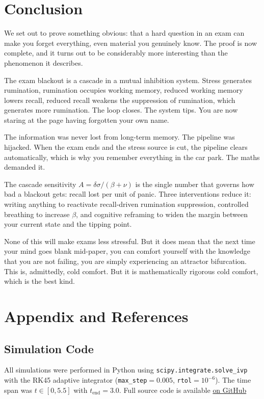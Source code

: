 \documentclass[11pt,a4paper]{article}
\begin{document}
\section{Conclusion}

We set out to prove something obvious: that a hard question in an
exam can make you forget everything, even material you genuinely
know. The proof is now complete, and it turns out to be considerably
more interesting than the phenomenon it describes.

The exam blackout is a cascade in a mutual inhibition system.
Stress generates rumination, rumination occupies working memory,
reduced working memory lowers recall, reduced recall weakens the
suppression of rumination, which generates more rumination. The
loop closes. The system tips. You are now staring at the page
having forgotten your own name.

The information was never lost from long-term memory. The pipeline
was hijacked. When the exam ends and the stress source is cut,
the pipeline clears automatically, which is why you remember
everything in the car park. The maths demanded it.

The cascade sensitivity $A = \delta\sigma/(\beta + \nu)$ is the
single number that governs how bad a blackout gets: recall lost
per unit of panic. Three interventions reduce it: writing anything
to reactivate recall-driven rumination suppression, controlled
breathing to increase $\beta$, and cognitive reframing to widen
the margin between your current state and the tipping point.

None of this will make exams less stressful. But it does mean that
the next time your mind goes blank mid-paper, you can comfort
yourself with the knowledge that you are not failing, you are
simply experiencing an attractor bifurcation. This is, admittedly,
cold comfort. But it is mathematically rigorous cold comfort, which
is the best kind.

\section*{Appendix and References}

\subsection*{Simulation Code}

All simulations were performed in Python using
\texttt{scipy.integrate.solve\_ivp} with the RK45 adaptive
integrator (\texttt{max\_step}$=0.005$, \texttt{rtol}$=10^{-6}$).
The time span was $t \in [0, 5.5]$ with $t_{\mathrm{end}} = 3.0$.
Full source code is available \href{https://github.com/f20251321/exam-blackout-paper}{on GitHub}
\end{document}
